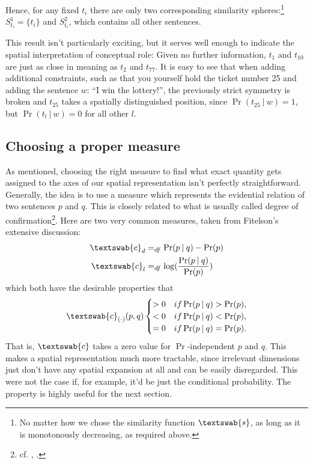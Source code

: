 \documentclass[11pt, a4paper]{scrartcl}
\newcommand{\m}[1]{\textswab{#1}}
\newcommand{\given}[1][]{\:#1\vert\:}
\begin{document}
Hence, for any fixed $t_i$ there are only two corresponding similarity spheres:\footnote{No matter how we chose the similarity function $\m{s}$, as long as it is monotonously decreasing, as required above.} $S^1_{t_i} = \{ t_i\}$ and $S^2_{t_i}$, which contains all other sentences. 

This result isn't particularly exciting, but it serves well enough to indicate the spatial interpretation of conceptual role: Given no further information, $t_1$ and $t_{10}$ are just as close in meaning as $t_2$ and $t_{77}$. It is easy to see that when adding additional constraints, such as that you yourself hold the ticket number 25 and adding the sentence $w$: ``I win the lottery!'', the previously strict symmetry is broken and $t_{25}$ takes a spatially distinguished position, since $\Pr(t_{25} \given w) = 1$, but $\Pr(t_l \given w) = 0$ for all other $l$. 

\subsection{Choosing a proper measure}\label{sec:choosing}

As mentioned, choosing the right measure to find what exact quantity gets assigned to the axes of our spatial representation isn't perfectly straightforward. Generally, the idea is to use a measure which represents the evidential relation of two sentences $p$ and $q$. This is closely related to what is usually called degree of confirmation\footnote{cf. \textcite{Fitelson1999-FITTPO-3}, \textcite{Broessel2013}.}. Here are two very common measures, taken from Fitelson's extensive discussion: 
\begin{align*}
    \m{c}_d &=_{df} \Pr(p\given q) - \Pr(p)\\
    \m{c}_l &=_{df} \log(\frac{\Pr(p\given q)}{\Pr(p)})
\end{align*}
which both have the desirable properties that
\[
\m{c}_{(\cdot)}(p, q) 
    \begin{cases} 
        > 0 & if \Pr(p \given q) > \Pr(p),\\
        < 0 & if \Pr(p \given q) < \Pr(p),\\
        = 0 & if \Pr(p \given q) = \Pr(p).
    \end{cases}
\]
That is, $\m{c}$ takes a zero value for $\Pr$-independent $p$ and $q$. This makes a spatial representation much more tractable, since irrelevant dimensions just don't have any spatial expansion at all and can be easily disregarded. This were not the case if, for example, it'd be just the conditional probability. The property is highly useful for the next section. 
\end{document}
